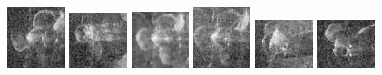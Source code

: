 \begin{figure}
    \includegraphics[width=0.15\textwidth]{chapters/images/dataset/all-class-images/propeler/propeler-67.jpg}
    \includegraphics[width=0.15\textwidth]{chapters/images/dataset/all-class-images/propeler/propeler-1.jpg}
    \includegraphics[width=0.15\textwidth]{chapters/images/dataset/all-class-images/propeler/propeler-40.jpg}
    \includegraphics[width=0.15\textwidth]{chapters/images/dataset/all-class-images/propeler/propeler-53.jpg}
    \includegraphics[width=0.15\textwidth]{chapters/images/dataset/all-class-images/propeler/propeler-115.jpg}
    \includegraphics[width=0.15\textwidth]{chapters/images/dataset/all-class-images/propeler/propeler-133.jpg}
    

\end{figure}
